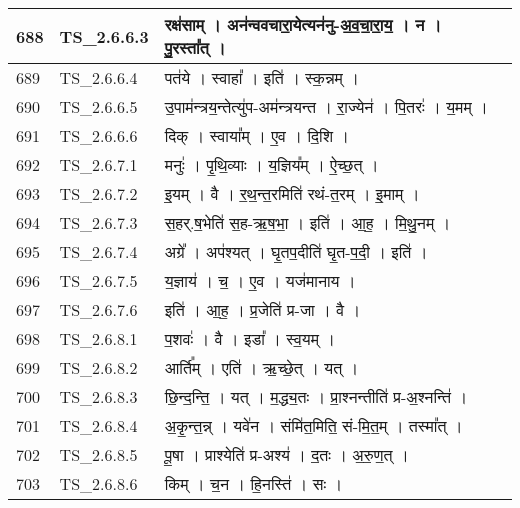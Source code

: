 \documentclass[17pt]{extarticle}
\begin{document}
\begin{longtable}{||p{0.4in}||p{0.9in}||p{4.0in}||p{0.9in}||}
        \hline
            688 & TS\_2.6.6.3 & रक्ष॑साम्   ।   अन॑न्ववचारा॒येत्यन॑नु{-}अ॒व॒चा॒रा॒य॒   ।   न   ।   पु॒रस्ता᳚त्   ।    &      \\
        \hline
            689 & TS\_2.6.6.4 & पत॑ये   ।   स्वाहा᳚   ।   इति॑   ।   स्क॒न्नम्   ।    &      \\
        \hline
            690 & TS\_2.6.6.5 & उ॒पाम॑न्त्रय॒न्तेत्यु॑प{-}अम॑न्त्रयन्त   ।   रा॒ज्येन॑   ।   पि॒तरः॑   ।   य॒मम्   ।    &      \\
        \hline
            691 & TS\_2.6.6.6 & दिक्   ।   स्वाया᳚म्   ।   ए॒व   ।   दि॒शि   ।    &      \\
        \hline
            692 & TS\_2.6.7.1 & मनुः॑   ।   पृ॒थि॒व्याः   ।   य॒ज्ञिय᳚म्   ।   ऐ॒च्छ॒त्   ।    &      \\
        \hline
            693 & TS\_2.6.7.2 & इ॒यम्   ।   वै   ।   र॒थ॒न्त॒रमिति॑ रथं{-}त॒रम्   ।   इ॒माम्   ।    &      \\
        \hline
            694 & TS\_2.6.7.3 & स॒हर्.ष॒भेति॑ स॒ह{-}ऋ॒ष॒भा॒   ।   इति॑   ।   आ॒ह॒   ।   मि॒थु॒नम्   ।    &      \\
        \hline
            695 & TS\_2.6.7.4 & अग्रे᳚   ।   अप॑श्यत्   ।   घृ॒तप॒दीति॑ घृ॒त{-}प॒दी॒   ।   इति॑   ।    &      \\
        \hline
            696 & TS\_2.6.7.5 & य॒ज्ञाय॑   ।   च॒   ।   ए॒व   ।   यज॑मानाय   ।    &      \\
        \hline
            697 & TS\_2.6.7.6 & इति॑   ।   आ॒ह॒   ।   प्र॒जेति॑ प्र{-}जा   ।   वै   ।    &      \\
        \hline
            698 & TS\_2.6.8.1 & प॒शवः॑   ।   वै   ।   इडा᳚   ।   स्व॒यम्   ।    &      \\
        \hline
            699 & TS\_2.6.8.2 & आर्ति᳚म्   ।   एति॑   ।   ऋ॒च्छे॒त्   ।   यत्   ।    &      \\
        \hline
            700 & TS\_2.6.8.3 & छि॒न्द॒न्ति॒   ।   यत्   ।   म॒द्ध्य॒तः   ।   प्रा॒श्नन्तीति॑ प्र{-}अ॒श्नन्ति॑   ।    &      \\
        \hline
            701 & TS\_2.6.8.4 & अ॒कृ॒न्त॒न्न्   ।   यवे॑न   ।   संमि॑त॒मिति॒ सं{-}मि॒त॒म्   ।   तस्मा᳚त्   ।    &      \\
        \hline
            702 & TS\_2.6.8.5 & पू॒षा   ।   प्राश्येति॑ प्र{-}अश्य॑   ।   द॒तः   ।   अ॒रु॒ण॒त्   ।    &      \\
        \hline
            703 & TS\_2.6.8.6 & किम्   ।   च॒न   ।   हि॒नस्ति॑   ।   सः   ।    &      \\
        \hline

\end{longtable}
\end{document}

